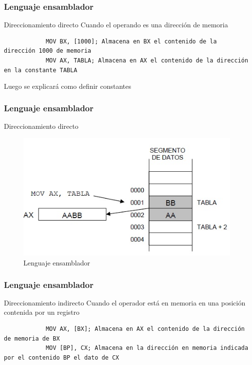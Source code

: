 \documentclass{beamer}
\begin{document}
\begin{frame}[fragile]
	\frametitle{Lenguaje ensamblador}
	\begin{block}{Direccionamiento directo}
		Cuando el operando es una dirección de memoria
		\begin{lstlisting}
			MOV BX, [1000]; Almacena en BX el contenido de la dirección 1000 de memoria
			MOV AX, TABLA; Almacena en AX el contenido de la dirección en la constante TABLA
		\end{lstlisting}
		Luego se explicará como definir constantes
	\end{block}		 		
\end{frame}

\begin{frame}
	\frametitle{Lenguaje ensamblador}
	\begin{block}{Direccionamiento directo}
			\begin{figure}[H]
				\centering
				\includegraphics[scale=0.6]{imagenes/ensambladordirecto.jpg}
				\caption{Lenguaje ensamblador}
			\end{figure}
	\end{block}		 		
\end{frame}

\begin{frame}[fragile]
	\frametitle{Lenguaje ensamblador}
	\begin{block}{Direccionamiento indirecto}
		Cuando el operador está en memoria en una posición contenida por un registro
		\begin{lstlisting}
			MOV AX, [BX]; Almacena en AX el contenido de la dirección de memoria de BX
			MOV [BP], CX; Almacena en la dirección en memoria indicada por el contenido BP el dato de CX
		\end{lstlisting}
	\end{block}
\end{frame}
	
\end{document}
